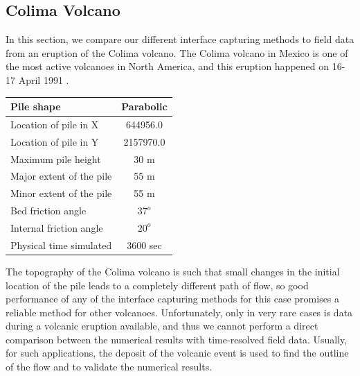 \documentclass[review]{elsarticle}
\begin{document}
\subsection{Colima Volcano}
In this section, we compare our different interface capturing methods to field data from an eruption of the Colima volcano. 
The Colima volcano in Mexico is one of the most active volcanoes in North America, and this eruption happened on 16-17 April 1991 \cite{Charbonnier2008}. 
\begin{center}
        \begin{tabular}{|l|c|}
                \hline
                Pile shape       & Parabolic \\
                \hline
                Location of pile in X     & 644956.0 \\
                \hline
                Location of pile in Y     & 2157970.0 \\
                \hline
                Maximum pile height       & 30 m \\
                \hline
                Major extent of the pile  & 55 m \\
                \hline
                Minor extent of the pile  & 55 m \\
                \hline           
                Bed friction angle        & $37^o$ \\
                \hline
                Internal friction angle  & $20^o$ \\
                \hline
                Physical time simulated  & 3600 sec \\
                \hline
        \end{tabular}
\end{center}
The topography of the Colima volcano is such that small changes in the initial location of the pile leads to a completely different 
path of flow, so good performance of any of the interface capturing methods for this case promises a reliable method for other volcanoes. 
Unfortunately, only in very rare cases is data during a volcanic eruption available, and thus we cannot perform a direct comparison between the numerical results 
with time-resolved field data.
Usually, for such applications, the deposit of the volcanic event is used to find the outline of the flow and to validate the numerical results.
\end{document}
